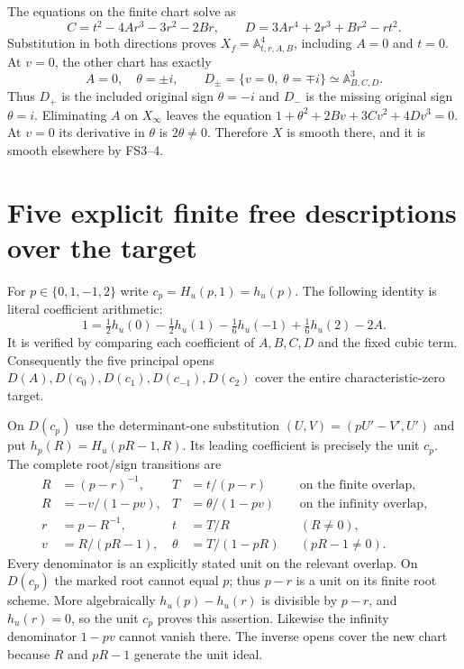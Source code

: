 The equations on the finite chart solve as
\begin{equation}
C=t^2-4Ar^3-3r^2-2Br,\qquad
D=3Ar^4+2r^3+Br^2-rt^2.
\tag{FS4}
\end{equation}
Substitution in both directions proves
$X_f=\mathbb A^4_{t,r,A,B}$, including $A=0$ and $t=0$.
At $v=0$, the other chart has exactly
\begin{equation}
A=0,\quad\theta=\pm i,\qquad
D_\pm=\{v=0,\ \theta=\mp i\}\simeq\mathbb A^3_{B,C,D}.
\tag{FS5}
\end{equation}
Thus $D_+$ is the included original sign $\theta=-i$ and
$D_-$ is the missing original sign $\theta=i$.
Eliminating $A$ on $X_\infty$ leaves the equation
$1+\theta^2+2Bv+3Cv^2+4Dv^3=0$.
At $v=0$ its derivative in $\theta$ is $2\theta\ne0$.
Therefore $X$ is smooth there, and it is smooth elsewhere
by FS3--4.

\section{Five explicit finite free descriptions over the target}
For $p\in\{0,1,-1,2\}$ write $c_p=H_u(p,1)=h_u(p)$.
The following identity is literal coefficient arithmetic:
\begin{equation}
1=\tfrac12h_u(0)-\tfrac12h_u(1)-\tfrac16h_u(-1)
                       +\tfrac16h_u(2)-2A .
\tag{FS6}
\end{equation}
It is verified by comparing each coefficient of $A,B,C,D$
and the fixed cubic term. Consequently the five principal
opens $D(A),D(c_0),D(c_1),D(c_{-1}),D(c_2)$ cover the
entire characteristic-zero target.

On $D(c_p)$ use the determinant-one substitution
$(U,V)=(pU'-V',U')$ and put
$h_p(R)=H_u(pR-1,R)$. Its leading coefficient is precisely
the unit $c_p$. The complete root/sign transitions are
\begin{align}
R&=(p-r)^{-1},&T&=t/(p-r)
                    &&\text{on the finite overlap},\nonumber\\
R&=-v/(1-pv),&T&=\theta/(1-pv)
                    &&\text{on the infinity overlap},\nonumber\\
r&=p-R^{-1},&t&=T/R&& (R\ne0),\nonumber\\
v&=R/(pR-1),&\theta&=T/(1-pR)&& (pR-1\ne0).
\tag{FS7}
\end{align}
Every denominator is an explicitly stated unit on the relevant
overlap. On $D(c_p)$ the marked root cannot equal $p$;
thus $p-r$ is a unit on its finite root scheme. More
algebraically $h_u(p)-h_u(r)$ is divisible by $p-r$,
and $h_u(r)=0$, so the unit $c_p$ proves this assertion.
Likewise the infinity denominator $1-pv$ cannot vanish
there. The inverse opens cover the new chart because $R$
and $pR-1$ generate the unit ideal.

